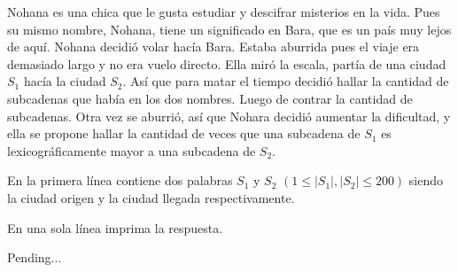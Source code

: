 
Nohana es una chica que le gusta estudiar y descifrar misterios en la vida. Pues su mismo nombre, Nohana, tiene un significado en Bara, que es un país muy lejos de aquí. Nohana decidió volar hacía Bara. Estaba aburrida pues el viaje era demasiado largo y no era vuelo directo. Ella miró la escala, partía de una ciudad $S_1$ hacía la ciudad $S_2$. Así que para matar el tiempo decidió hallar la cantidad de subcadenas que había en los dos nombres. Luego de contrar la cantidad de subcadenas. Otra vez se aburrió, así que Nohara decidió aumentar la dificultad, y ella se propone hallar la cantidad de veces que una subcadena de $S_1$ es lexicográficamente mayor a una subcadena de $S_2$.


En la primera línea contiene dos palabras $S_1$ y $S_2$ $(1 \le |S_1|,|S_2| \le 200)$ siendo la ciudad origen y la ciudad llegada respectivamente.

\outputText

En una sola línea imprima la respuesta.

\exampleCases

\begin{example}
\end{example}

\explanationText

Pending...